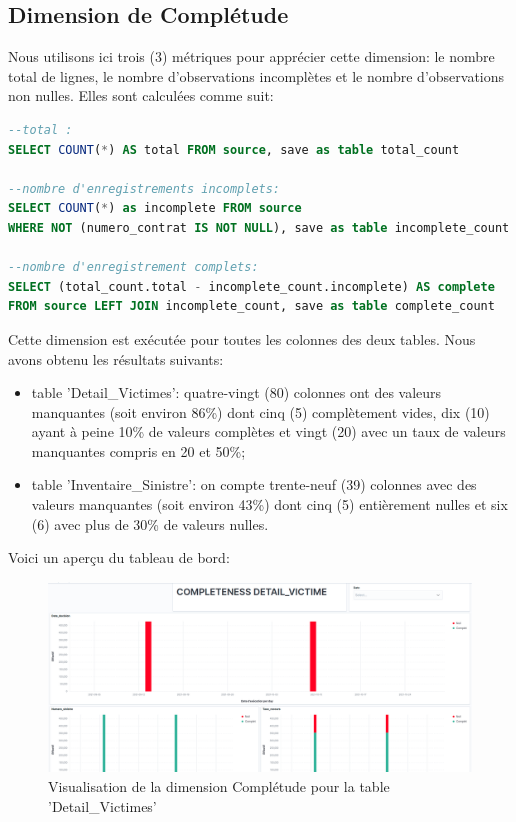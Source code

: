 \subsection{Dimension de Compl\'etude} 
Nous utilisons ici trois (3) m\'etriques pour appr\'ecier cette dimension: le nombre total de lignes, le nombre d'observations incompl\`etes et le nombre d'observations non nulles. Elles sont calcul\'ees comme suit: 
\begin{lstlisting}[language=SQL,caption={R\`egles de la Dimension Compl\'etude},captionpos=t ,showspaces=false,basicstyle=\scriptsize,numbers=none,commentstyle=\color{gray},backgroundcolor=\color{background}]
--total : 
SELECT COUNT(*) AS total FROM source, save as table total_count

--nombre d'enregistrements incomplets: 
SELECT COUNT(*) as incomplete FROM source 
WHERE NOT (numero_contrat IS NOT NULL), save as table incomplete_count

--nombre d'enregistrement complets: 
SELECT (total_count.total - incomplete_count.incomplete) AS complete 
FROM source LEFT JOIN incomplete_count, save as table complete_count
\end{lstlisting}
Cette dimension est ex\'ecut\'ee pour toutes les colonnes des deux tables. Nous avons obtenu les r\'esultats suivants:  
\begin{itemize}[parsep=0cm,itemsep=0cm]
\item table 'Detail\_Victimes': quatre-vingt (80) colonnes ont des valeurs manquantes (soit environ 86\%) dont cinq (5) compl\`etement vides, dix (10) ayant \`a peine 10\% de valeurs compl\`etes et vingt (20) avec un taux de valeurs manquantes compris en 20 et 50\%;
\item table 'Inventaire\_Sinistre': on compte trente-neuf (39) colonnes avec des valeurs manquantes (soit environ 43\%) dont cinq (5) enti\`erement nulles et six (6) avec plus de 30\% de valeurs nulles.
\end{itemize}
Voici un aperçu du tableau de bord:
\begin{figure}[H]
        \caption{Visualisation de la dimension Compl\'etude pour la table 'Detail\_Victimes'}  \label{fig:tttay}
    \begin{center}
      \includegraphics[scale = 0.27]{Main/Static/Completeness_Detail_Victime.png} 
    \end{center}
\end{figure}
